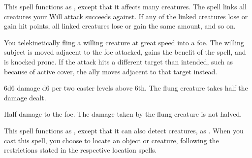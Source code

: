 \begin{spelleffect}
  This spell functions as , except that it affects many creatures. The spell links all creatures your Will attack succeeds against. If any of the linked creatures lose or gain hit points, all linked creatures lose or gain the same amount, and so on.
\end{spelleffect}

\spellrng{\rngclose}
\begin{spelleffect}
    You telekinetically fling a willing creature at great speed into a foe. The willing subject is moved adjacent to the foe attacked, gains the benefit of the  spell, and is knocked prone. If the attack hits a different target than intended, such as because of active cover, the ally moves adjacent to that target instead.
\end{spelleffect}
\begin{spellsuccess}
    6d6 damage \add d6 per two caster levels above 6th. The flung creature takes half the damage dealt.
\end{spellsuccess}
\begin{spellfailure}
    Half damage to the foe. The damage taken by the flung creature is not halved.
\end{spellfailure}

\spellrng{\rngext}
\begin{spelleffect}
  This spell functions as , except that it can also detect creatures, as . When you cast this spell, you choose to locate an object or creature, following the restrictions stated in the respective location spells.
\end{spelleffect}

